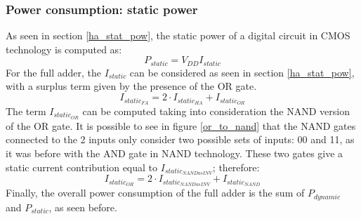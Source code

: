 \subsubsection{Power consumption: static power}
As seen in section \ref{ha_stat_pow}, the static power of a digital circuit in CMOS technology is computed as:
\begin{equation}
P_{static} = V_{DD}I_{static}
\end{equation}
For the full adder, the $I_{static}$ can be considered as seen in section \ref{ha_stat_pow}, with a surplus term given by the presence of the OR gate.
\begin{equation}
I_{static_{FA}} = 2\cdot I_{static_{HA}} + I_{static_{OR}}
\end{equation}
The term $I_{static_{OR}}$ can be computed taking into consideration the NAND version of the OR gate. It is possible to see in figure \ref{or_to_nand} that the NAND gates connected to the 2 inputs only consider two possible sets of inputs: 00 and 11, as it was before with the AND gate in NAND technology. These two gates give a static current contribution equal to $I_{static_{NANDasINV}}$; therefore:
\begin{equation}
I_{static_{OR}} = 2\cdot I_{static_{NANDasINV}} + I_{static_{NAND}}
\end{equation}
Finally, the overall power consumption of the full adder is the sum of $P_{dynamic}$ and $P_{static}$, as seen before.